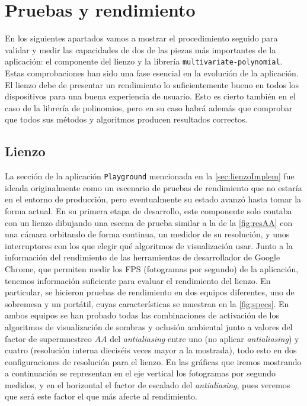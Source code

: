 \chapter{Pruebas y rendimiento}
En los siguientes apartados vamos a mostrar el procedimiento seguido para validar y medir las capacidades de dos de las piezas más importantes de la aplicación: el componente del lienzo y la librería \texttt{multivariate-polynomial}.  Estas comprobaciones han sido una fase esencial en la evolución de la aplicación. El lienzo debe de presentar un rendimiento lo suficientemente bueno en todos los dispositivos para una buena experiencia de usuario. Esto es cierto también en el caso de la librería de polinomios, pero en su caso habrá además que comprobar que todos sus métodos y algoritmos producen resultados correctos.

\section{Lienzo}
La sección de la aplicación \texttt{Playground} mencionada en la \autoref{sec:lienzoImplem} fue ideada originalmente como un escenario de pruebas de rendimiento que no estaría en el entorno de producción, pero eventualmente su estado avanzó hasta tomar la forma actual. En su primera etapa de desarrollo, este componente solo contaba con un lienzo dibujando una escena de prueba similar a la de la \autoref{fig:resAA} con una cámara orbitando de forma continua, un medidor de su resolución, y unos interruptores con los que elegir qué algoritmos de visualización usar. Junto a la información del rendimiento de las herramientas de desarrollador de Google Chrome, que permiten medir los FPS (fotogramas por segundo) de la aplicación, tenemos información suficiente para evaluar el rendimiento del lienzo. En particular, se hicieron pruebas de rendimiento en dos equipos diferentes, uno de sobremesa y un portátil, cuyas características se muestran en la \autoref{fig:specs}. En ambos equipos se han probado todas las combinaciones de activación de los algoritmos de visualización de sombras y oclusión ambiental junto a valores del factor de supermuestreo $AA$ del \textit{antialiasing} entre uno (no aplicar \textit{antialiasing}) y cuatro (resolución interna dieciséis veces mayor a la mostrada), todo esto en dos configuraciones de resolución para el lienzo. En las gráficas que iremos mostrando a continuación se representan en el eje vertical los fotogramas por segundo medidos, y en el horizontal el factor de escalado del \textit{antialiasing}, pues veremos que será este factor el que más afecte al rendimiento.\newline
